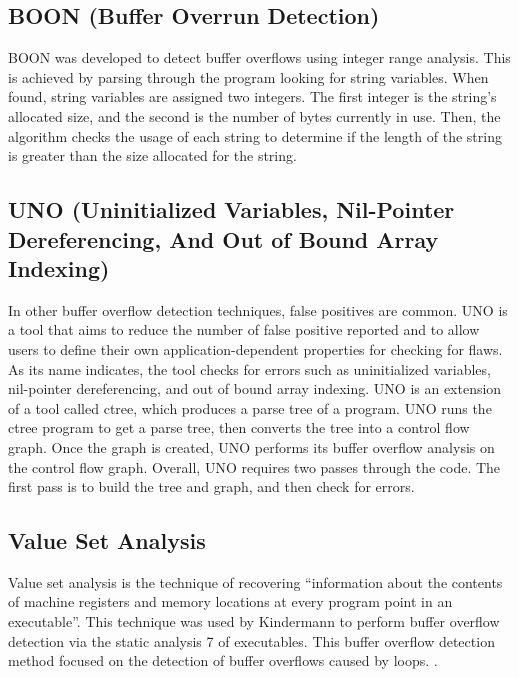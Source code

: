 \subsection{BOON (Buffer Overrun Detection)}
BOON was developed to detect buffer overflows using integer range analysis. This is achieved by parsing through the program looking for string variables. When found, string variables are assigned two integers. The first integer is the string’s allocated size, and the second is the number of bytes currently in use. Then, the algorithm checks the usage of each string to determine if the length of the string is greater than the size allocated for the string.

\subsection{UNO (Uninitialized Variables, Nil-Pointer Dereferencing, And Out of Bound Array Indexing)}
In other buffer overflow detection techniques, false positives are common. UNO is a tool that aims to reduce the number of false positive reported and to allow users to define their own application-dependent properties for checking for flaws. As its name indicates, the tool checks for errors such as uninitialized variables, nil-pointer dereferencing, and out of bound array indexing. UNO is an extension of a tool called ctree, which produces a parse tree of a program. UNO runs the ctree program to get a parse tree, then converts the tree into a control flow graph. Once the graph is created, UNO performs its buffer overflow analysis on the control flow graph. Overall, UNO requires two passes through the code. The first pass is to build the tree and graph, and then check for errors.

\subsection{Value Set Analysis}
Value set analysis is the technique of recovering “information about the contents of machine registers and memory locations at every program point in an executable”. This technique was used by Kindermann to perform buffer overflow detection via the static analysis 7 of executables. This buffer overflow detection method focused on the detection of buffer overflows caused by loops.
\cite{Four}.